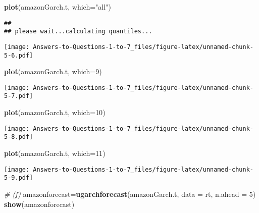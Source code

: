 \documentclass[
]{article}
\newenvironment{Shaded}{\begin{snugshade}}{\end{snugshade}}
\newcommand{\AttributeTok}[1]{\textcolor[rgb]{0.13,0.29,0.53}{#1}}
\newcommand{\CommentTok}[1]{\textcolor[rgb]{0.56,0.35,0.01}{\textit{#1}}}
\newcommand{\DecValTok}[1]{\textcolor[rgb]{0.00,0.00,0.81}{#1}}
\newcommand{\FunctionTok}[1]{\textcolor[rgb]{0.13,0.29,0.53}{\textbf{#1}}}
\newcommand{\NormalTok}[1]{#1}
\newcommand{\OtherTok}[1]{\textcolor[rgb]{0.56,0.35,0.01}{#1}}
\newcommand{\StringTok}[1]{\textcolor[rgb]{0.31,0.60,0.02}{#1}}
\begin{document}
\begin{Shaded}
\begin{Highlighting}[]
\FunctionTok{plot}\NormalTok{(amazonGarch.t, }\AttributeTok{which=}\StringTok{"all"}\NormalTok{)}
\end{Highlighting}
\end{Shaded}

\begin{verbatim}
## 
## please wait...calculating quantiles...
\end{verbatim}

\texttt{[image: Answers-to-Questions-1-to-7\_files/figure-latex/unnamed-chunk-5-6.pdf]}

\begin{Shaded}
\begin{Highlighting}[]
\FunctionTok{plot}\NormalTok{(amazonGarch.t, }\AttributeTok{which=}\DecValTok{9}\NormalTok{)}
\end{Highlighting}
\end{Shaded}

\texttt{[image: Answers-to-Questions-1-to-7\_files/figure-latex/unnamed-chunk-5-7.pdf]}

\begin{Shaded}
\begin{Highlighting}[]
\FunctionTok{plot}\NormalTok{(amazonGarch.t, }\AttributeTok{which=}\DecValTok{10}\NormalTok{)}
\end{Highlighting}
\end{Shaded}

\texttt{[image: Answers-to-Questions-1-to-7\_files/figure-latex/unnamed-chunk-5-8.pdf]}

\begin{Shaded}
\begin{Highlighting}[]
\FunctionTok{plot}\NormalTok{(amazonGarch.t, }\AttributeTok{which=}\DecValTok{11}\NormalTok{)}
\end{Highlighting}
\end{Shaded}

\texttt{[image: Answers-to-Questions-1-to-7\_files/figure-latex/unnamed-chunk-5-9.pdf]}

\begin{Shaded}
\begin{Highlighting}[]
\CommentTok{\# (f)}
\NormalTok{amazonforecast}\OtherTok{=}\FunctionTok{ugarchforecast}\NormalTok{(amazonGarch.t, }\AttributeTok{data =}\NormalTok{ rt, }\AttributeTok{n.ahead =} \DecValTok{5}\NormalTok{)}
\FunctionTok{show}\NormalTok{(amazonforecast)}
\end{Highlighting}
\end{Shaded}
\end{document}
